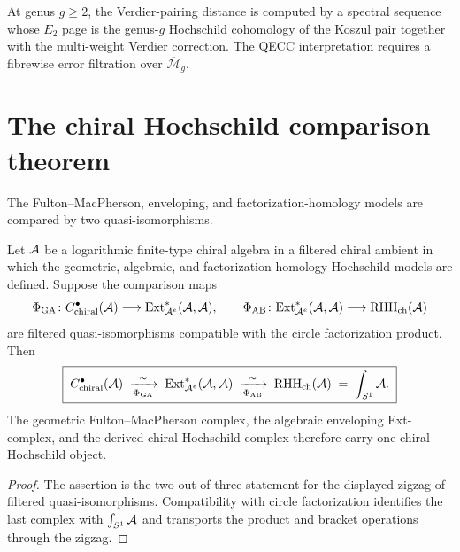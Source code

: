 \begin{conjecture}
\label{conj:verdier-distance-higher-genus}
At genus $g \geq 2$, the Verdier-pairing distance is computed by a
spectral sequence whose $E_2$ page is the genus-$g$ Hochschild cohomology
of the Koszul pair together with the multi-weight Verdier correction.
The QECC interpretation requires a fibrewise error filtration over
$\overline{\mathcal M}_g$.
\end{conjecture}


\section{The chiral Hochschild comparison theorem}
\label{sec:chiral-hochschild-trinity}

The Fulton--MacPherson, enveloping, and factorization-homology models
are compared by two quasi-isomorphisms.

\begin{theorem}
\label{thm:chiral-hochschild-trinity}
\label{prop:chiral-hochschild-comparison-locus}
Let $\mathcal{A}$ be a logarithmic finite-type chiral algebra in a filtered
chiral ambient in which the geometric, algebraic, and
factorization-homology Hochschild models are defined. Suppose the
comparison maps
\[
 \Phi_{\mathrm{GA}}\colon
 C^\bullet_{\mathrm{chiral}}(\mathcal{A})
 \longrightarrow
 \mathrm{Ext}^*_{\mathcal{A}^e}(\mathcal{A},\mathcal{A}),
 \qquad
 \Phi_{\mathrm{AB}}\colon
 \mathrm{Ext}^*_{\mathcal{A}^e}(\mathcal{A},\mathcal{A})
 \longrightarrow
 \mathrm{RHH}_{\mathrm{ch}}(\mathcal{A})
\]
are filtered quasi-isomorphisms compatible with the circle
factorization product. Then
\[
 \boxed{\;C^\bullet_{\mathrm{chiral}}(\mathcal{A})
 \;\xrightarrow[\Phi_{\mathrm{GA}}]{\sim}\;
 \mathrm{Ext}^*_{\mathcal{A}^e}(\mathcal{A}, \mathcal{A})
 \;\xrightarrow[\Phi_{\mathrm{AB}}]{\sim}\;
 \mathrm{RHH}_{\mathrm{ch}}(\mathcal{A})
 \;=\; \int_{S^1} \mathcal{A}.\;}
\]
The geometric Fulton--MacPherson complex, the algebraic enveloping
Ext-complex, and the derived chiral Hochschild complex therefore carry
one chiral Hochschild object.
\end{theorem}

\begin{proof}
The assertion is the two-out-of-three statement for the displayed
zigzag of filtered quasi-isomorphisms. Compatibility with circle
factorization identifies the last complex with
$\int_{S^1}\mathcal{A}$ and transports the product and bracket operations
through the zigzag.
\end{proof}

